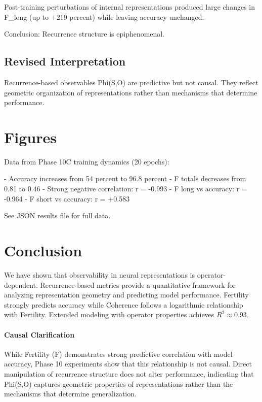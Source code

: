 \documentclass[11pt]{article}
\begin{document}
Post-training perturbations of internal representations produced large changes in F\_long (up to +219 percent) while leaving accuracy unchanged.

Conclusion: Recurrence structure is epiphenomenal.

\subsection{Revised Interpretation}

Recurrence-based observables Phi(S,O) are predictive but not causal. They reflect geometric organization of representations rather than mechanisms that determine performance.

\section{Figures}

Data from Phase 10C training dynamics (20 epochs):

- Accuracy increases from 54 percent to 96.8 percent
- F totals decreases from 0.81 to 0.46
- Strong negative correlation: r = -0.993
- F long vs accuracy: r = -0.964
- F short vs accuracy: r = +0.583

See JSON results file for full data.

\section{Conclusion}

We have shown that observability in neural representations is operator-dependent. Recurrence-based metrics provide a quantitative framework for analyzing representation geometry and predicting model performance. Fertility strongly predicts accuracy while Coherence follows a logarithmic relationship with Fertility. Extended modeling with operator properties achieves $R^2 \approx 0.93$.

\paragraph{Causal Clarification}
While Fertility (F) demonstrates strong predictive correlation with model accuracy, Phase 10 experiments show that this relationship is not causal. Direct manipulation of recurrence structure does not alter performance, indicating that Phi(S,O) captures geometric properties of representations rather than the mechanisms that determine generalization.
\end{document}
